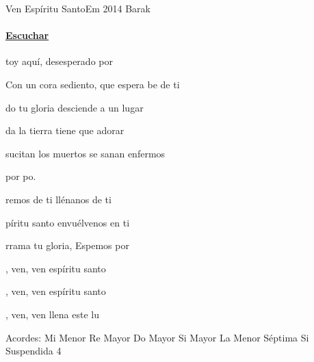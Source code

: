 \documentclass[12pt, spanish]{book}
\newcommand{\NotCCLIed}{\relax}
\begin{document}
    \begin{song}{Ven Espíritu Santo}{Em}
    {2014} %
    {Barak}
    {} %
    {} %
        \ifChordBk
        \paragraph{\mbox{}\hfill\protect\href{https://open.spotify.com/intl-es/track/5Zp3GgOitUTntY4l3iXctD}{Escuchar}\mbox{}\hfill}
        \fi



        \begin{SBOpGroup}
            toy aquí, desesperado por 

            Con un cora sediento, que espera be de ti

            do tu gloria desciende a un lugar

            da la tierra tiene que adorar

            sucitan los muertos se sanan enfermos

            por  po.

            remos de ti llénanos de ti

            píritu santo envuélvenos en ti

            rrama tu gloria, Espemos por 
        \end{SBOpGroup}

        \begin{SBChorus}
            , ven, ven espíritu santo

            , ven, ven espíritu santo

            , ven, ven llena este lu
        \end{SBChorus}

        \ifChordBk
        \begin{SBOpGroup}
            Acordes:\break
            \upchord{\Em}\qquad Mi Menor \hfill
            \upchord{\D}\qquad Re Mayor \hfill\null\break
            \upchord{\C}\qquad Do Mayor \hfill
            \upchord{\B}\qquad\qquad Si Mayor \hfill\null\break
            \upchord{\Amseven}\qquad La Menor S\'eptima \hfill
            \upchord{\Bsus}\qquad Si Suspendida 4 \hfill\null\break
        \end{SBOpGroup}
        \fi
    \end{song}
\end{document}
